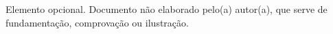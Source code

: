 
\label{anx:exemplo}

Elemento opcional. Documento não elaborado pelo(a) autor(a), que serve de fundamentação, comprovação ou ilustração.

% 
